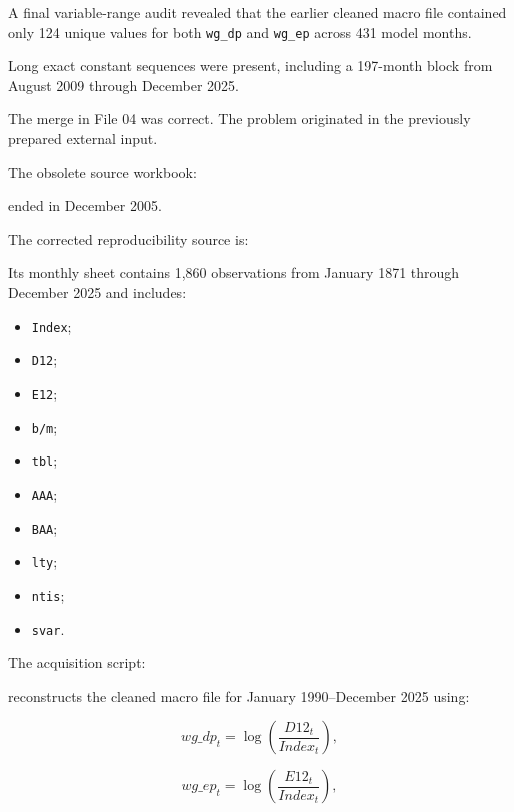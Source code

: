 \documentclass[11pt,a4paper]{article}
\newcommand{\code}[1]{\texttt{#1}}
\begin{document}
A final variable-range audit revealed that the earlier cleaned macro file
contained only 124 unique values for both \code{wg\_dp} and \code{wg\_ep}
across 431 model months.

Long exact constant sequences were present, including a 197-month block from
August 2009 through December 2025.

The merge in File 04 was correct. The problem originated in the previously
prepared external input.

The obsolete source workbook:

\begin{center}
\end{center}

ended in December 2005.

The corrected reproducibility source is:

\begin{center}
\end{center}

Its monthly sheet contains 1,860 observations from January 1871 through
December 2025 and includes:

\begin{itemize}
  \item \code{Index};
  \item \code{D12};
  \item \code{E12};
  \item \code{b/m};
  \item \code{tbl};
  \item \code{AAA};
  \item \code{BAA};
  \item \code{lty};
  \item \code{ntis};
  \item \code{svar}.
\end{itemize}

The acquisition script:

\begin{center}
\end{center}

reconstructs the cleaned macro file for January 1990--December 2025 using:

\[
  wg\_dp_t
  =
  \log
  \left(
  \frac{D12_t}{Index_t}
  \right),
\]

\[
  wg\_ep_t
  =
  \log
  \left(
  \frac{E12_t}{Index_t}
  \right),
\]
\end{document}
